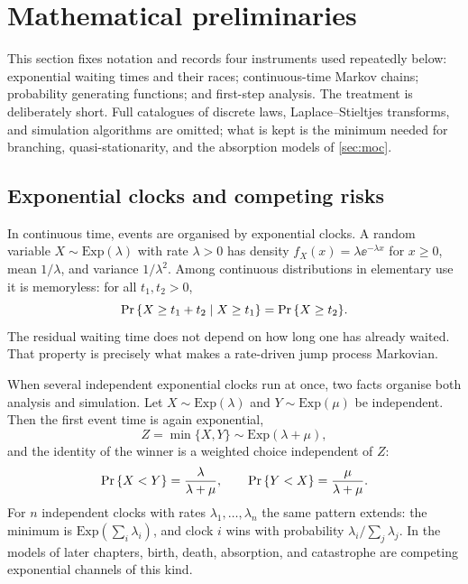 \section{Mathematical preliminaries}
\label{sec:prelim}

This section fixes notation and records four instruments used repeatedly below:
exponential waiting times and their races; continuous-time Markov chains; probability
generating functions; and first-step analysis. The treatment is deliberately short.
Full catalogues of discrete laws, Laplace--Stieltjes transforms, and simulation
algorithms are omitted; what is kept is the minimum needed for branching, quasi-stationarity,
and the absorption models of \cref{sec:moc}.

\subsection{Exponential clocks and competing risks}
\label{sec:exp-race}

In continuous time, events are organised by exponential clocks. A random variable
$X\sim\mathrm{Exp}(\lambda)$ with rate $\lambda>0$ has density
$f_X(x)=\lambda\ee^{-\lambda x}$ for $x\ge 0$, mean $1/\lambda$, and variance
$1/\lambda^2$. Among continuous distributions in elementary use it is memoryless: for
all $t_1,t_2>0$,
\begin{equation*}
{\text{Pr}\left\{X\ge t_1+t_2\mid X\ge t_1\right\}}={\text{Pr}\left\{X\ge t_2\right\}}.
\end{equation*}
The residual waiting time does not depend on how long one has already waited. That
property is precisely what makes a rate-driven jump process Markovian.

When several independent exponential clocks run at once, two facts organise both
analysis and simulation. Let $X\sim\mathrm{Exp}(\lambda)$ and $Y\sim\mathrm{Exp}(\mu)$ be
independent. Then the first event time is again exponential,
\begin{equation}
\label{eq:minXY}
Z=\min\{X,Y\}\sim\mathrm{Exp}(\lambda+\mu),
\end{equation}
and the identity of the winner is a weighted choice independent of $Z$:
\begin{equation}
\label{eq:compXY}
{\text{Pr}\left\{X<Y\right\}}=\frac{\lambda}{\lambda+\mu},\qquad
{\text{Pr}\left\{Y<X\right\}}=\frac{\mu}{\lambda+\mu}.
\end{equation}
For $n$ independent clocks with rates $\lambda_1,\ldots,\lambda_n$ the same pattern
extends: the minimum is $\mathrm{Exp}(\sum_i\lambda_i)$, and clock $i$ wins with
probability $\lambda_i/\sum_j\lambda_j$. In the models of later chapters, birth, death,
absorption, and catastrophe are competing exponential channels of this kind.

